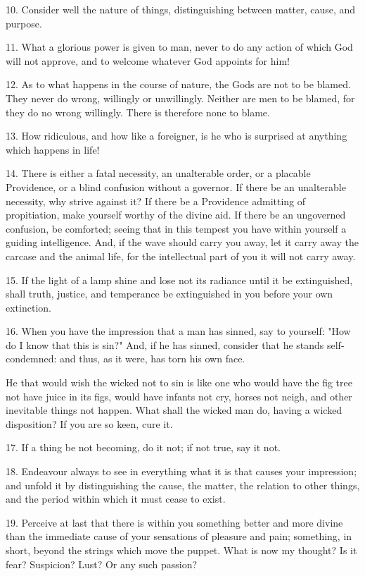 \documentclass{book}
\begin{document}
10. Consider well the nature of things, distinguishing between matter,
cause, and purpose.

11. What a glorious power is given to man, never to do any action of
which God will not approve, and to welcome whatever God appoints for
him!

12. As to what happens in the course of nature, the Gods are not to be
blamed. They never do wrong, willingly or unwillingly. Neither are men
to be blamed, for they do no wrong willingly. There is therefore none
to blame.

13. How ridiculous, and how like a foreigner, is he who is surprised
at anything which happens in life!

14. There is either a fatal necessity, an unalterable order, or a
placable Providence, or a blind confusion without a governor. If there
be an unalterable necessity, why strive against it? If there be a
Providence admitting of propitiation, make yourself worthy of the
divine aid. If there be an ungoverned confusion, be comforted; seeing
that in this tempest you have within yourself a guiding
intelligence. And, if the wave should carry you away, let it carry
away the carcase and the animal life, for the intellectual part of you
it will not carry away.

15. If the light of a lamp shine and lose not its radiance until it be
extinguished, shall truth, justice, and temperance be extinguished in
you before your own extinction.

16. When you have the impression that a man has sinned, say to
yourself: "How do I know that this is sin?" And, if he has sinned,
consider that he stands self-condemned: and thus, as it were, has torn
his own face.

He that would wish the wicked not to sin is like one who would have
the fig tree not have juice in its figs, would have infants not cry,
horses not neigh, and other inevitable things not happen. What shall
the wicked man do, having a wicked disposition? If you are so keen,
cure it.

17. If a thing be not becoming, do it not; if not true, say it not.

18. Endeavour always to see in everything what it is that causes your
impression; and unfold it by distinguishing the cause, the matter, the
relation to other things, and the period within which it must cease to
exist.

19. Perceive at last that there is within you something better and
more divine than the immediate cause of your sensations of pleasure
and pain; something, in short, beyond the strings which move the
puppet. What is now my thought? Is it fear? Suspicion? Lust? Or any
such passion?
\end{document}
